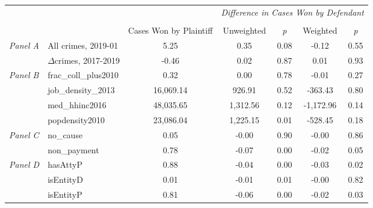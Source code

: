 \begin{tabular}{llccccc}
\toprule
 &  & \textit{} & \multicolumn{4}{c}{\textit{Difference in Cases Won by Defendant}} \\
\cline{4-7}
\\
 &  & Cases Won by Plaintiff & Unweighted & \emph{p} & Weighted & \emph{p} \\
\midrule
\multirow[c]{2}{1.5cm}{\textit{Panel A}} & All crimes, 2019-01 & 5.25 & 0.35 & 0.08 & -0.12 & 0.55 \\
 & $\Delta$crimes, 2017-2019 & -0.46 & 0.02 & 0.87 & 0.01 & 0.93 \\
\cline{1-7}
\multirow[c]{4}{1.5cm}{\textit{Panel B}} & frac\_coll\_plus2010 & 0.32 & 0.00 & 0.78 & -0.01 & 0.27 \\
 & job\_density\_2013 & 16,069.14 & 926.91 & 0.52 & -363.43 & 0.80 \\
 & med\_hhinc2016 & 48,035.65 & 1,312.56 & 0.12 & -1,172.96 & 0.14 \\
 & popdensity2010 & 23,086.04 & 1,225.15 & 0.01 & -528.45 & 0.18 \\
\cline{1-7}
\multirow[c]{2}{1.5cm}{\textit{Panel C}} & no\_cause & 0.05 & -0.00 & 0.90 & -0.00 & 0.86 \\
 & non\_payment & 0.78 & -0.07 & 0.00 & -0.02 & 0.05 \\
\cline{1-7}
\multirow[c]{3}{1.5cm}{\textit{Panel D}} & hasAttyP & 0.88 & -0.04 & 0.00 & -0.03 & 0.02 \\
 & isEntityD & 0.01 & -0.01 & 0.01 & -0.00 & 0.82 \\
 & isEntityP & 0.81 & -0.06 & 0.00 & -0.02 & 0.03 \\
\cline{1-7}
\bottomrule
\end{tabular}
